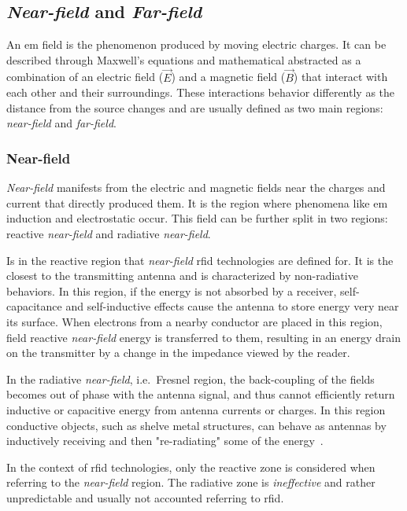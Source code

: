 \subsection{\emph{Near-field} and \emph{Far-field}}

An \ac{em} field is the phenomenon produced by moving electric charges. It can be described through Maxwell's equations and mathematical abstracted as a combination of an electric field ($\vec{E}$) and a magnetic field ($\vec{B}$) that interact with each other and their surroundings.
These interactions behavior differently as the distance from the source changes and are usually defined as two main regions: \emph{near-field} and \emph{far-field}.

\subsubsection{Near-field}

\emph{Near-field} manifests from the electric and magnetic fields near the charges and current that directly produced them. It is the region where phenomena like \ac{em} induction and electrostatic occur.
This field can be further split in two regions: reactive \emph{near-field} and radiative \emph{near-field}.

Is in the reactive region that \emph{near-field} \ac{rfid} technologies are defined for. It is the closest to the transmitting antenna and is characterized by non-radiative behaviors. In this region, if the energy is not absorbed by a receiver, self-capacitance and self-inductive effects cause the antenna to store energy very near its surface. When electrons from a nearby conductor are placed in this region, field reactive \emph{near-field} energy is transferred to them, resulting in an energy drain on the transmitter by a change in the impedance viewed by the reader.

In the radiative \emph{near-field}, i.e.\ Fresnel region, the back-coupling of the fields becomes out of phase with the antenna signal, and thus cannot efficiently return inductive or capacitive energy from antenna currents or charges.
In this region conductive objects, such as shelve metal structures, can behave as antennas by inductively receiving and then "re-radiating" some of the energy~\cite{ElectromagneticRadiationField}.

In the context of \ac{rfid} technologies, only the reactive zone is considered when referring to the \emph{near-field} region. The radiative zone is \textit{ineffective} and rather unpredictable and usually not accounted referring to \ac{rfid}.

